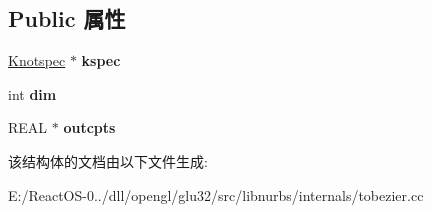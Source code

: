 \subsection*{Public 属性}
\begin{DoxyCompactItemize}
\item 
\mbox{\label{struct_splinespec_af78b4b0d9c76c5998747b1b4479c352d}} 
\hyperlink{struct_knotspec}{Knotspec} $\ast$ {\bfseries kspec}
\item 
\mbox{\label{struct_splinespec_aa1a15d947a5ba37dcc8750312bd16cbd}} 
int {\bfseries dim}
\item 
\mbox{\label{struct_splinespec_a7cf757fdc786ab9c5dfc60926a087790}} 
R\+E\+AL $\ast$ {\bfseries outcpts}
\end{DoxyCompactItemize}


该结构体的文档由以下文件生成\+:\begin{DoxyCompactItemize}
\item 
E\+:/\+React\+O\+S-\/0../dll/opengl/glu32/src/libnurbs/internals/tobezier.\+cc\end{DoxyCompactItemize}
